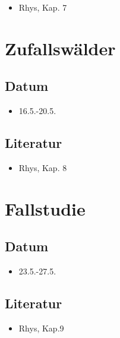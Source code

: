\documentclass[
]{book}
\providecommand{\tightlist}{%
  \setlength{\itemsep}{0pt}\setlength{\parskip}{0pt}}
\begin{document}
\begin{itemize}
\tightlist
\item
  Rhys, Kap. 7
\end{itemize}

\hypertarget{zufallswuxe4lder}{%
\section{Zufallswälder}\label{zufallswuxe4lder}}

\hypertarget{datum-9}{%
\subsection{Datum}\label{datum-9}}

\begin{itemize}
\tightlist
\item
  16.5.-20.5.
\end{itemize}

\hypertarget{literatur-9}{%
\subsection{Literatur}\label{literatur-9}}

\begin{itemize}
\tightlist
\item
  Rhys, Kap. 8
\end{itemize}

\hypertarget{fallstudie}{%
\section{Fallstudie}\label{fallstudie}}

\hypertarget{datum-10}{%
\subsection{Datum}\label{datum-10}}

\begin{itemize}
\tightlist
\item
  23.5.-27.5.
\end{itemize}

\hypertarget{literatur-10}{%
\subsection{Literatur}\label{literatur-10}}

\begin{itemize}
\tightlist
\item
  Rhys, Kap.9
\end{itemize}
\end{document}

